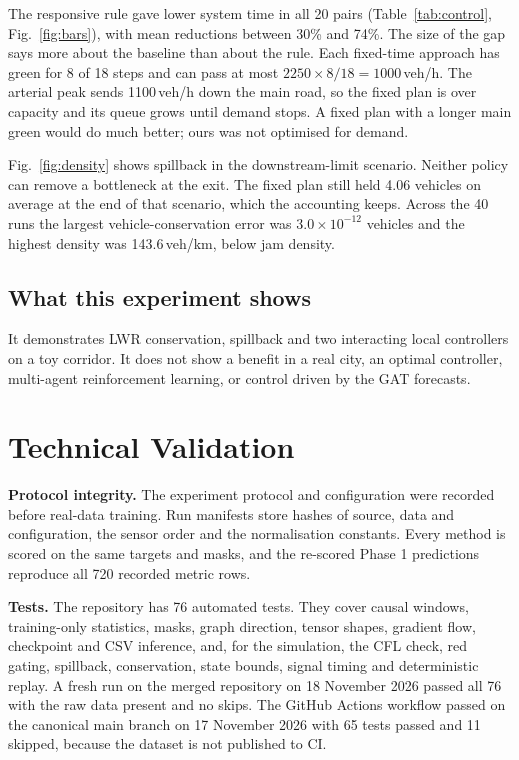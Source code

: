 \documentclass[conference]{IEEEtran}
\begin{document}
The responsive rule gave lower system time in all 20 pairs (Table~\ref{tab:control}, Fig.~\ref{fig:bars}), with mean reductions between 30\% and 74\%. The size of the gap says more about the baseline than about the rule. Each fixed-time approach has green for 8 of 18 steps and can pass at most $2250\times8/18=1000$\,veh/h. The arterial peak sends 1100\,veh/h down the main road, so the fixed plan is over capacity and its queue grows until demand stops. A fixed plan with a longer main green would do much better; ours was not optimised for demand.

Fig.~\ref{fig:density} shows spillback in the downstream-limit scenario. Neither policy can remove a bottleneck at the exit. The fixed plan still held 4.06 vehicles on average at the end of that scenario, which the accounting keeps. Across the 40 runs the largest vehicle-conservation error was $3.0\times10^{-12}$ vehicles and the highest density was 143.6\,veh/km, below jam density.

\subsection{What this experiment shows}
It demonstrates LWR conservation, spillback and two interacting local controllers on a toy corridor. It does not show a benefit in a real city, an optimal controller, multi-agent reinforcement learning, or control driven by the GAT forecasts.

\section{Technical Validation}
\textbf{Protocol integrity.} The experiment protocol and configuration were recorded before real-data training. Run manifests store hashes of source, data and configuration, the sensor order and the normalisation constants. Every method is scored on the same targets and masks, and the re-scored Phase 1 predictions reproduce all 720 recorded metric rows.

\textbf{Tests.} The repository has 76 automated tests. They cover causal windows, training-only statistics, masks, graph direction, tensor shapes, gradient flow, checkpoint and CSV inference, and, for the simulation, the CFL check, red gating, spillback, conservation, state bounds, signal timing and deterministic replay. A fresh run on the merged repository on 18 November 2026 passed all 76 with the raw data present and no skips. The GitHub Actions workflow passed on the canonical main branch on 17 November 2026 with 65 tests passed and 11 skipped, because the dataset is not published to CI.
\end{document}
